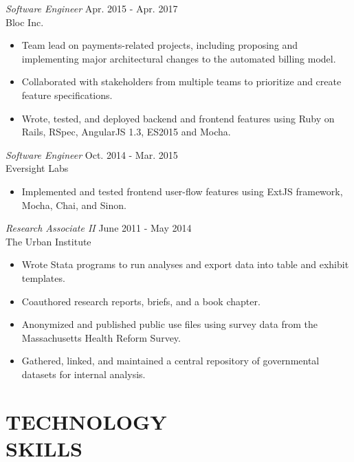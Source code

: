 \documentclass[margin, 10pt]{res} %
\begin{document}
\begin{resume}
{\sl Software Engineer} \hfill Apr. 2015 - Apr. 2017 \\
Bloc Inc.
\begin{itemize} \itemsep -2pt %
\item Team lead on payments-related projects, including proposing and implementing major architectural changes to the automated billing model.
\item Collaborated with stakeholders from multiple teams to prioritize and create feature specifications.
\item Wrote, tested, and deployed backend and frontend features using Ruby on Rails, RSpec, AngularJS 1.3, ES2015 and Mocha.
\end{itemize}

{\sl Software Engineer} \hfill Oct. 2014 - Mar. 2015 \\
Eversight Labs
\begin{itemize} \itemsep -2pt %
\item Implemented and tested frontend user-flow features using ExtJS framework, Mocha, Chai, and Sinon.
\end{itemize}

{\sl  Research Associate II } \hfill June 2011 - May 2014\\
The Urban Institute
\begin{itemize} \itemsep -2pt %
\item Wrote Stata programs to run analyses and export data into table and exhibit templates.
\item Coauthored research reports, briefs, and a book chapter.
\item Anonymized and published public use files using survey data from the Massachusetts Health Reform Survey.
\item Gathered, linked, and maintained a central repository of governmental datasets for internal analysis.
\end{itemize}


\section{\small\bf TECHNOLOGY \\ SKILLS}


\end{resume}
\end{document}
